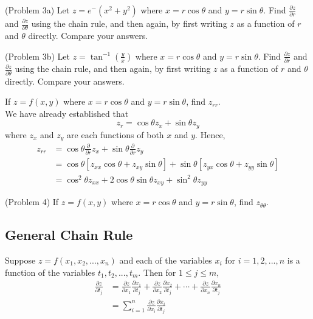\documentclass[handout]{ximera}
\begin{document}
\begin{problem}(Problem 3a)
Let $z = e^-(x^2 + y^2)$ where $x = r\cos \theta$ and $y = r\sin \theta$.  
Find $\frac{\partial z}{\partial r}$ and $\frac{\partial z}{\partial \theta}$ using the chain rule, 
and then again, by first writing $z$ as a function of $r$ and $\theta$ directly. Compare your answers.
\end{problem}

\begin{problem}(Problem 3b)
Let $z = \tan^{-1}\left(\frac{y}{x}\right)$ where $x = r\cos \theta$ and $y = r\sin \theta$.  
Find $\frac{\partial z}{\partial r}$ and $\frac{\partial z}{\partial \theta}$ using the chain rule, and then again, 
by first writing $z$ as a function of $r$ and $\theta$ directly.
Compare your answers.
\end{problem}


\begin{example}[Example 4]
If $z = f(x,y)$ where $x = r\cos \theta$ and $y = r \sin \theta$, find $z_{rr}$.\\
We have already established that
\[
z_r = \cos \theta z_x + \sin \theta z_y
\]
where $z_x$ and $z_y$ are each functions of both $x$ and $y$. Hence,
\begin{align*}
z_{rr} &= \cos \theta \frac{\partial}{\partial r} z_x + \sin \theta \frac{\partial}{\partial r} z_y\\
       &= \cos \theta \left[z_{xx}\cos \theta + z_{xy} \sin \theta \right] + 
       \sin \theta \left[ z_{yx} \cos \theta + z_{yy} \sin \theta  \right]\\
       &= \cos^2 \theta z_{xx} + 2\cos \theta \sin \theta z_{xy} + \sin^2 \theta z_{yy}
\end{align*}
\end{example}

\begin{problem}(Problem 4) 
If $z = f(x,y)$ where $x = r\cos \theta$ and $y = r \sin \theta$, find $z_{\theta \theta}$.
\end{problem}
       
\subsection{General Chain Rule}
Suppose $z = f(x_1, x_2, ..., x_n)$ and each of the variables $x_i$ for $i = 1, 2, ..., n$ is a function of the variables
$t_1, t_2,..., t_m$. Then for $1 \leq j \leq m$,
\begin{align*}
\frac{\partial z}{\partial t_j} &= \frac{\partial z}{\partial x_1}\frac{\partial x_1}{\partial t_j} 
                     + \frac{\partial z}{\partial x_2}\frac{\partial x_2}{\partial t_j} + \cdots + \frac{\partial z}{\partial x_n}\frac{\partial x_n}{\partial t_j}\\
                               &= \sum_{i = 1}^n \frac{\partial z}{\partial x_i}\frac{\partial x_i}{\partial t_j}
\end{align*}
\end{document}
